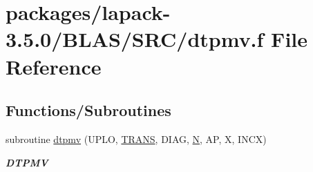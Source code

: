 \hypertarget{lapack-3_85_80_2BLAS_2SRC_2dtpmv_8f}{}\section{packages/lapack-\/3.5.0/\+B\+L\+A\+S/\+S\+R\+C/dtpmv.f File Reference}
\label{lapack-3_85_80_2BLAS_2SRC_2dtpmv_8f}
\subsection*{Functions/\+Subroutines}
\begin{DoxyCompactItemize}
\item 
subroutine \hyperlink{group__double__blas__level2_ga1d9a8ecfddfea2c84e73e28e1ebb74cf}{dtpmv} (U\+P\+L\+O, \hyperlink{superlu__enum__consts_8h_a0c4e17b2d5cea33f9991ccc6a6678d62a1f61e3015bfe0f0c2c3fda4c5a0cdf58}{T\+R\+A\+N\+S}, D\+I\+A\+G, \hyperlink{polmisc_8c_a0240ac851181b84ac374872dc5434ee4}{N}, A\+P, X, I\+N\+C\+X)
\begin{DoxyCompactList}\small\item\em {\bfseries D\+T\+P\+M\+V} \end{DoxyCompactList}\end{DoxyCompactItemize}
